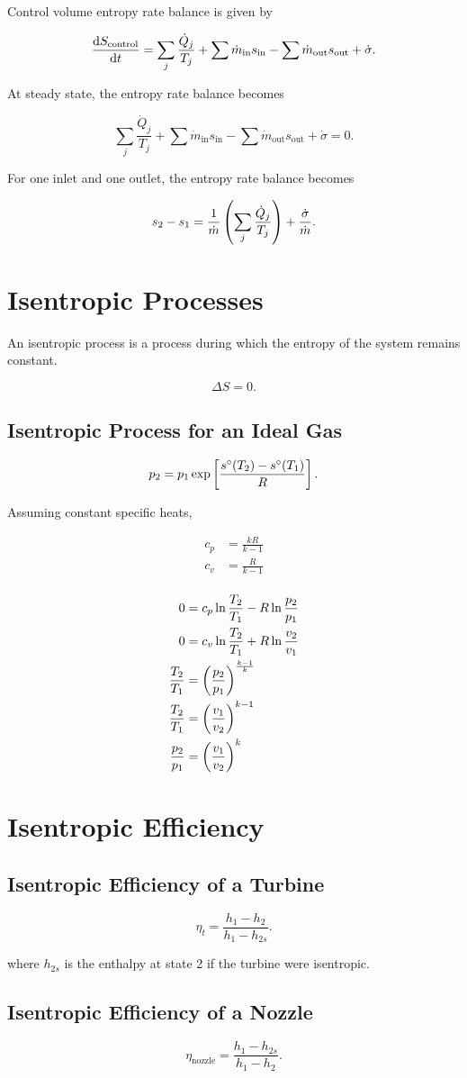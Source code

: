 \documentclass{report}
\begin{document}
Control volume entropy rate balance is given by

\[
	\dv{S_\text{control}}{t} = \sum_j \frac{\dot{Q}_j}{T_j} + \sum \dot{m}_\text{in} s_\text{in} - \sum \dot{m}_\text{out} s_\text{out} + \dot{\sigma}
	.\]

At steady state, the entropy rate balance becomes

\[
	\sum_j \frac{\dot{Q}_j}{T_j} + \sum \dot{m}_\text{in} s_\text{in} - \sum \dot{m}_\text{out} s_\text{out} + \dot{\sigma} = 0
	.\]

For one inlet and one outlet, the entropy rate balance becomes

\[
	s_2 - s_1 = \frac{1}{\dot{m}} \left( \sum_j \frac{\dot{Q}_j}{T_j} \right) + \frac{\dot{\sigma}}{\dot{m}}
	.\]

\section{Isentropic Processes}

An isentropic process is a process during which the entropy of the system remains constant.

\[
	\Delta S = 0
	.\]

\subsection{Isentropic Process for an Ideal Gas}

\[
	p_2 = p_1 \exp\left[ \frac{s^\circ(T_2) - s^\circ(T_1)}{R} \right]
	.\]

Assuming constant specific heats,

\begin{align*}
	c_p & = \frac{kR}{k-1} \\
	c_v & = \frac{R}{k-1}  \\
\end{align*}

\begin{align*}
	0               & = c_p \ln\frac{T_2}{T_1} - R\ln\frac{p_2}{p_1} \\
	0               & = c_v \ln\frac{T_2}{T_1} + R\ln\frac{v_2}{v_1} \\
	\frac{T_2}{T_1} & = \left(\frac{p_2}{p_1}\right)^{\frac{k-1}{k}}      \\
	\frac{T_2}{T_1} & = \left(\frac{v_1}{v_2}\right)^{k-1}                \\
	\frac{p_2}{p_1} & = \left(\frac{v_1}{v_2}\right)^k
\end{align*}

\section{Isentropic Efficiency}

\subsection{Isentropic Efficiency of a Turbine}

\[
	\eta_t = \frac{h_1 - h_2}{h_1 - h_{2s}}
	.\]

where $h_{2s}$ is the enthalpy at state 2 if the turbine were isentropic.

\subsection{Isentropic Efficiency of a Nozzle}

\[
	\eta_\text{nozzle} = \frac{h_1 - h_{2s}}{h_1-h_2}
	.\]
\end{document}
